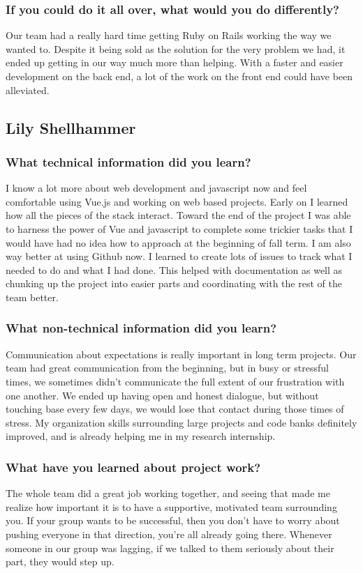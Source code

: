 \documentclass[draftclsnofoot,onecolumn,letterpaper,10pt]{IEEEtran}
\begin{document}
		\subsubsection{If you could do it all over, what would you do differently?}

		Our team had a really hard time getting Ruby on Rails working the way we wanted to.
		Despite it being sold as the solution for the very problem we had, it ended up getting in our way much more than helping.
		With a faster and easier development on the back end, a lot of the work on the front end could have been alleviated.

	\subsection{Lily Shellhammer}
		\subsubsection{What technical information did you learn?}
		I know a lot more about web development and javascript now and feel comfortable using Vue.js and working on web based projects.
		Early on I learned how all the pieces of the stack interact.
		Toward the end of the project I was able to harness the power of Vue and javascript to complete some trickier tasks that I would have had no idea how to approach at the beginning of fall term.
		I am also way better at using Github now.
		I learned to create lots of issues to track what I needed to do and what I had done.
		This helped with documentation as well as chunking up the project into easier parts and coordinating with the rest of the team better.
		\subsubsection{What non-technical information did you learn?}
		Communication about expectations is really important in long term projects.
		Our team had great communication from the beginning, but in busy or stressful times, we sometimes didn't communicate the full extent of our frustration with one another.
		We ended up having open and honest dialogue, but without touching base every few days, we would lose that contact during those times of stress.
		My organization skills surrounding large projects and code banks definitely improved, and is already helping me in my research internship.
		\subsubsection{What have you learned about project work?}
		The whole team did a great job working together, and seeing that made me realize how important it is to have a supportive, motivated team surrounding you.
	  If your group wants to be successful, then you don't have to worry about pushing everyone in that direction, you're all already going there.
		Whenever someone in our group was lagging, if we talked to them seriously about their part, they would step up.
\end{document}
